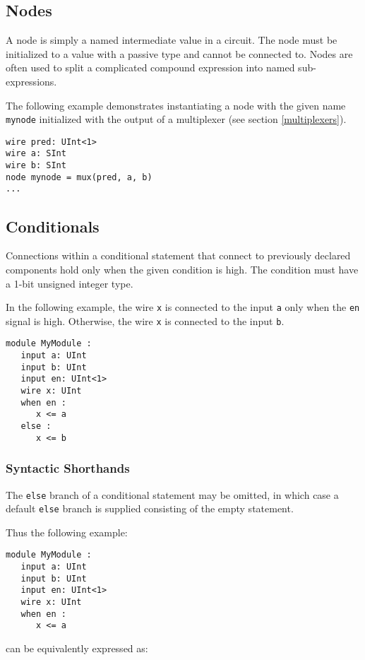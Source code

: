 \documentclass[12pt]{article}
\begin{document}
\subsection{Nodes}
A node is simply a named intermediate value in a circuit. The node must be initialized to a value with a passive type and cannot be connected to. Nodes are often used to split a complicated compound expression into named sub-expressions.

The following example demonstrates instantiating a node with the given name \verb|mynode| initialized with the output of a multiplexer (see section \ref{multiplexers}).

\begin{lstlisting}
wire pred: UInt<1>
wire a: SInt
wire b: SInt
node mynode = mux(pred, a, b)
...
\end{lstlisting}

\subsection{Conditionals}\label{conditionals}
Connections within a conditional statement that connect to previously declared components hold only when the given condition is high. The condition must have a 1-bit unsigned integer type.

In the following example, the wire \verb|x| is connected to the input \verb|a| only when the \verb|en| signal is high. Otherwise, the wire \verb|x| is connected to the input \verb|b|.

\begin{lstlisting}
module MyModule :
   input a: UInt
   input b: UInt
   input en: UInt<1>
   wire x: UInt
   when en :
      x <= a
   else :
      x <= b
\end{lstlisting}

\subsubsection{Syntactic Shorthands}
The \verb|else| branch of a conditional statement may be omitted, in which case a default \verb|else| branch is supplied consisting of the empty statement.

Thus the following example:

\begin{lstlisting}
module MyModule :
   input a: UInt
   input b: UInt
   input en: UInt<1>
   wire x: UInt
   when en :
      x <= a
\end{lstlisting}

can be equivalently expressed as:
\end{document}
